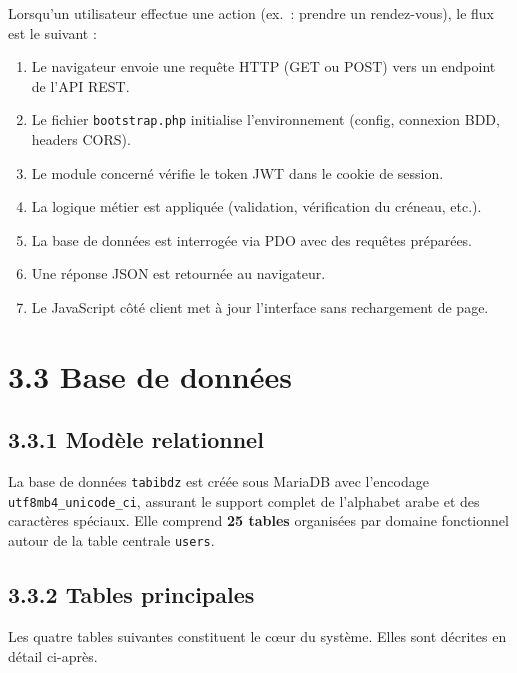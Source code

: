 \documentclass[12pt,a4paper]{report}
\begin{document}
Lorsqu'un utilisateur effectue une action (ex.~: prendre un rendez-vous), le flux est le suivant :

\begin{enumerate}
    \item Le navigateur envoie une requ\^ete HTTP (GET ou POST) vers un endpoint de l'API REST.
    \item Le fichier \texttt{bootstrap.php} initialise l'environnement (config, connexion BDD, headers CORS).
    \item Le module concern\'e v\'erifie le token JWT dans le cookie de session.
    \item La logique m\'etier est appliqu\'ee (validation, v\'erification du cr\'eneau, etc.).
    \item La base de donn\'ees est interrog\'ee via PDO avec des requ\^etes pr\'epar\'ees.
    \item Une r\'eponse JSON est retourn\'ee au navigateur.
    \item Le JavaScript c\^ot\'e client met \`a jour l'interface sans rechargement de page.
\end{enumerate}

\section*{3.3 Base de donn\'ees}

\subsection*{3.3.1 Mod\`ele relationnel}

La base de donn\'ees \texttt{tabibdz} est cr\'e\'ee sous MariaDB avec l'encodage \texttt{utf8mb4\_unicode\_ci}, assurant le support complet de l'alphabet arabe et des caract\`eres sp\'eciaux. Elle comprend \textbf{25 tables} organis\'ees par domaine fonctionnel autour de la table centrale \texttt{users}.

\subsection*{3.3.2 Tables principales}

Les quatre tables suivantes constituent le c\oe{}ur du syst\`eme. Elles sont d\'ecrites en d\'etail ci-apr\`es.
\end{document}
